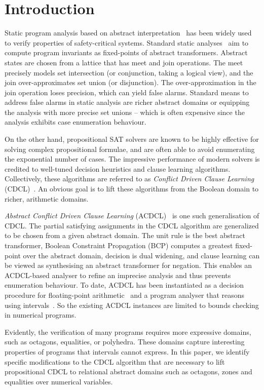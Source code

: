 \section{Introduction}

%
Static program analysis based on abstract interpretation~\cite{CC77, 
DBLP:conf/pldi/BlanchetCCFMMMR03} has been widely used to 
verify properties of safety-critical systems.
Standard static analyses~\cite{se2011} aim to compute program invariants as
fixed-points of abstract transformers.  Abstract states are chosen from a
lattice that has meet and join operations.  The meet precisely models set
intersection (or conjunction, taking a logical view), and the join
over-approximates set union (or disjunction).  The over-approximation in the
join operation loses precision, which can yield false
alarms.  Standard means to address false alarms in static analysis are 
richer abstract domains or equipping the analysis with more precise set
unions -- which is often expensive since the analysis exhibits case
enumeration behaviour.

%
On the other hand, propositional SAT solvers are known to be highly
effective for solving complex propositional formulae, and are often
able to avoid enumerating the exponential number of cases.  The impressive
performance of modern solvers is credited to well-tuned decision heuristics
and clause learning algorithms.  Collectively, these
algorithms are referred to as \emph{Conflict Driven Clause Learning}
(CDCL)~\cite{cdcl}. An obvious goal is to lift these algorithms from the Boolean
domain to richer, arithmetic domains.

\emph{Abstract Conflict Driven Clause Learning} (ACDCL)~\cite{dhk2013-popl}
is one such generalisation of CDCL.  The partial satisfying assignments in
the CDCL algorithm are generalized to be chosen from a given abstract domain. 
The unit rule is the best abstract transformer, Boolean Constraint
Propagation (BCP) computes a greatest fixed-point over the abstract domain,
decision is dual widening, and clause learning can be viewed as synthesising
an abstract transformer for negation.  This enables an ACDCL-based analyser
to refine an imprecise analysis and thus prevents enumeration behaviour. 
To date, ACDCL has been instantiated as a decision procedure for
floating-point arithmetic~\cite{DBLP:journals/fmsd/BrainDGHK14} and a
program analyser that reasons using intervals~\cite{tacas12}.  So the
existing ACDCL instances are limited to bounds checking in numerical
programs.

Evidently, the verification of many programs requires more expressive
domains, such as octagons, equalities, or polyhedra.  These domains capture
interesting properties of programs that intervals cannot express.  In this
paper, we identify specific modifications to the CDCL algorithm that are
necessary to lift propositional CDCL to relational abstract domains such as
octagons, zones and equalities over numerical variables.
